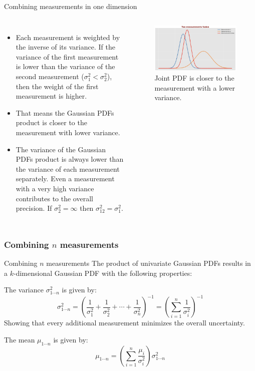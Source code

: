 \begin{frame}{Combining measurements in one dimension}
\begin{columns}
    \begin{itemize}
        \item Each measurement is weighted by the inverse of its variance. If the variance of the first measurement is lower than the variance of the second measurement ($\sigma^2_1 < \sigma^2_2$), then the weight of the first measurement is higher.
        \item That means the Gaussian PDFs product is closer to the measurement with lower
variance.
        \item The variance of the Gaussian PDFs product is always lower than the variance of each measurement separately. Even a measurement with a very high variance contributes to the overall precision. If $\sigma^2_2 = \infty$ then $\sigma^2_{12} = \sigma^2_1$.
    \end{itemize}
    \begin{figure}
        \centering
        \includegraphics[width=0.5\linewidth]{Figures//Part4/TwoMeasurementsFusion.png}
        \vspace{-10pt}
        \caption{Joint PDF is closer to the measurement with a lower variance.}
        \vspace{-10pt}
    \end{figure}
    \end{columns}
\end{frame}


\subsubsection{Combining $n$ measurements}
\begin{frame}{Combining $n$ measurements}
The product of univariate Gaussian PDFs results in a \( k \)-dimensional Gaussian PDF with the following properties:

The variance \( \sigma^2_{1 \cdots n} \) is given by:
\begin{equation*}
\sigma^2_{1 \cdots n} = \left( \frac{1}{\sigma^2_1} + \frac{1}{\sigma^2_2} + \cdots + \frac{1}{\sigma^2_n} \right)^{-1} = \left( \sum_{i=1}^{n} \frac{1}{\sigma^2_i} \right)^{-1}
\end{equation*}
Showing that every additional measurement minimizes the overall uncertainty.
\vspace{5pt}

The mean \( \mu_{1 \cdots n} \) is given by:
\begin{equation*}
\mu_{1 \cdots n} = \left( \sum_{i=1}^{n} \frac{\mu_i}{\sigma^2_i} \right) \sigma^2_{1 \cdots n}
\end{equation*}

\end{frame}

